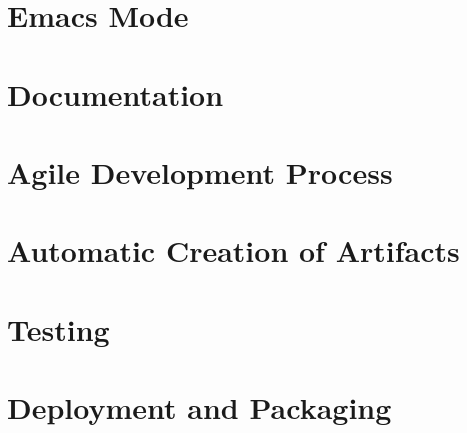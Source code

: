 \documentclass{article}
\begin{document}
\section{Emacs Mode}








\section{Documentation}










\section{Agile Development Process}



\section{Automatic Creation of Artifacts}



\section{Testing}






\section{Deployment and Packaging}


\end{document}
